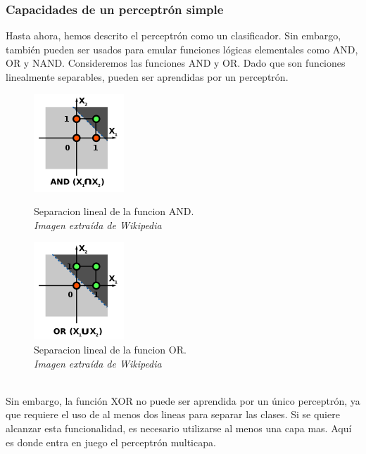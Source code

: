 \subsubsection{Capacidades de un perceptrón simple}
Hasta ahora, hemos descrito el perceptrón como un clasificador. Sin embargo, también pueden ser usados para emular funciones lógicas elementales como AND, OR y NAND. Consideremos las funciones AND y OR. Dado que son funciones linealmente separables, pueden ser aprendidas por un perceptrón.
\begin{figure}[htp]
\centering
\begin{minipage}[b]{0.4\textwidth}
    \includegraphics[scale=1]{images/perceptron_and.png}
    \caption{Separacion lineal de la funcion AND.\\\textit{Imagen extraída de Wikipedia}}
  \end{minipage}
\hfill
\begin{minipage}[b]{0.4\textwidth}
    \includegraphics[scale=1]{images/perceptron_or.png}
  \caption{Separacion lineal de la funcion OR.\\\textit{Imagen extraída de Wikipedia}}
  \end{minipage}
\end{figure}
\\Sin embargo, la función XOR no puede ser aprendida por un único perceptrón, ya que requiere el uso de al menos dos lineas para separar las clases. Si se quiere alcanzar esta funcionalidad, es necesario utilizarse al menos una capa mas. Aquí es donde entra en juego el perceptrón multicapa.

